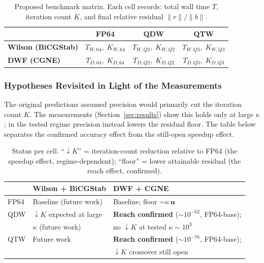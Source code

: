 \documentclass[12pt,a4paper]{article}
\newcommand{\uu}{\mathbf{u}}
\begin{document}
\begin{table}[H]
\centering
\caption{Proposed benchmark matrix.
         Each cell records: total wall time $T$, iteration count $K$,
         and final relative residual $\|r\|/\|b\|$.}
\begin{tabular}{lccc}
\toprule
 & \textbf{FP64} & \textbf{QDW} & \textbf{QTW} \\
\midrule
\textbf{Wilson (BiCGStab)}  & $T_{W,64},\;K_{W,64}$ & $T_{W,Q2},\;K_{W,Q2}$ & $T_{W,Q3},\;K_{W,Q3}$ \\
\textbf{DWF (CGNE)}         & $T_{D,64},\;K_{D,64}$ & $T_{D,Q2},\;K_{D,Q2}$ & $T_{D,Q3},\;K_{D,Q3}$ \\
\bottomrule
\end{tabular}
\end{table}

\subsubsection{Hypotheses Revisited in Light of the Measurements}

The original predictions assumed precision would primarily cut the iteration
count $K$. The measurements (Section~\ref{sec:results}) show this holds only at
large $\kappa$; in the tested regime precision instead lowers the residual
floor. The table below separates the confirmed accuracy effect from the
still-open speedup effect.

\begin{table}[H]
\centering
\caption{Status per cell. ``$\downarrow K$'' = iteration-count reduction
         relative to FP64 (the speedup effect, regime-dependent);
         ``floor'' = lower attainable residual (the reach effect, confirmed).}
\begin{tabular}{lll}
\toprule
 & \textbf{Wilson + BiCGStab} & \textbf{DWF + CGNE} \\
\midrule
FP64 & Baseline (future work)            & Baseline; floor $\sim\kappa\,\uu$ \\[4pt]
QDW  & $\downarrow K$ expected at large  & \textbf{Reach confirmed} ($\sim\!10^{-62}$, FP64-base); \\
     & $\kappa$ (future work)            & no $\downarrow K$ at tested $\kappa\sim10^3$ \\[4pt]
QTW  & Future work                       & \textbf{Reach confirmed} ($\sim\!10^{-76}$, FP64-base); \\
     &                                   & $\downarrow K$ crossover still open \\
\bottomrule
\end{tabular}
\end{table}
\end{document}
